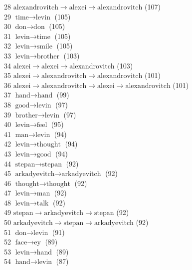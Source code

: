 \begin{appendices}
    28  $ \text{alexandrovitch} \to \text{alexei} \to \text{alexandrovitch} $ (107) \\
    29  $ \text{time} \to \text{levin} $ (105) \\
    30  $ \text{don} \to \text{don} $ (105) \\
    31  $ \text{levin} \to \text{time} $ (105) \\
    32  $ \text{levin} \to \text{smile} $ (105) \\
    33  $ \text{levin} \to \text{brother} $ (103) \\
    34  $ \text{alexei} \to \text{alexei} \to \text{alexandrovitch} $ (103) \\
    35  $ \text{alexei} \to \text{alexandrovitch} \to \text{alexandrovitch} $ (101) \\
    36  $ \text{alexei} \to \text{alexandrovitch} \to \text{alexei} \to \text{alexandrovitch} $ (101) \\
    37  $ \text{hand} \to \text{hand} $ (99) \\
    38  $ \text{good} \to \text{levin} $ (97) \\
    39  $ \text{brother} \to \text{levin} $ (97) \\
    40  $ \text{levin} \to \text{feel} $ (95) \\
    41  $ \text{man} \to \text{levin} $ (94) \\
    42  $ \text{levin} \to \text{thought} $ (94) \\
    43  $ \text{levin} \to \text{good} $ (94) \\
    44  $ \text{stepan} \to \text{stepan} $ (92) \\
    45  $ \text{arkadyevitch} \to \text{arkadyevitch} $ (92) \\
    46  $ \text{thought} \to \text{thought} $ (92) \\
    47  $ \text{levin} \to \text{man} $ (92) \\
    48  $ \text{levin} \to \text{talk} $ (92) \\
    49  $ \text{stepan} \to \text{arkadyevitch} \to \text{stepan} $ (92) \\
    50  $ \text{arkadyevitch} \to \text{stepan} \to \text{arkadyevitch} $ (92) \\
    51  $ \text{don} \to \text{levin} $ (91) \\
    52  $ \text{face} \to \text{ey} $ (89) \\
    53  $ \text{levin} \to \text{hand} $ (89) \\
    54  $ \text{hand} \to \text{levin} $ (87) \\

\end{appendices}

